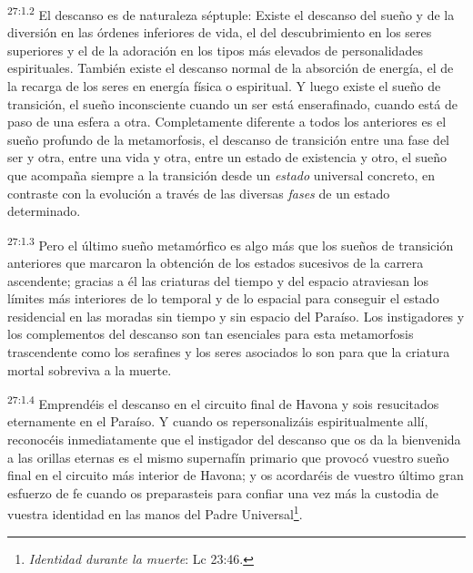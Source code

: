 \par
\textsuperscript{27:1.2} El descanso es de naturaleza séptuple: Existe el descanso del sueño y de la diversión en las órdenes inferiores de vida, el del descubrimiento en los seres superiores y el de la adoración en los tipos más elevados de personalidades espirituales. También existe el descanso normal de la absorción de energía, el de la recarga de los seres en energía física o espiritual. Y luego existe el sueño de transición, el sueño inconsciente cuando un ser está enserafinado, cuando está de paso de una esfera a otra. Completamente diferente a todos los anteriores es el sueño profundo de la metamorfosis, el descanso de transición entre una fase del ser y otra, entre una vida y otra, entre un estado de existencia y otro, el sueño que acompaña siempre a la transición desde un \textit{estado} universal concreto, en contraste con la evolución a través de las diversas \textit{fases} de un estado determinado.

\par
\textsuperscript{27:1.3} Pero el último sueño metamórfico es algo más que los sueños de transición anteriores que marcaron la obtención de los estados sucesivos de la carrera ascendente; gracias a él las criaturas del tiempo y del espacio atraviesan los límites más interiores de lo temporal y de lo espacial para conseguir el estado residencial en las moradas sin tiempo y sin espacio del Paraíso. Los instigadores y los complementos del descanso son tan esenciales para esta metamorfosis trascendente como los serafines y los seres asociados lo son para que la criatura mortal sobreviva a la muerte.

\par
\textsuperscript{27:1.4} Emprendéis el descanso en el circuito final de Havona y sois resucitados eternamente en el Paraíso. Y cuando os repersonalizáis espiritualmente allí, reconocéis inmediatamente que el instigador del descanso que os da la bienvenida a las orillas eternas es el mismo supernafín primario que provocó vuestro sueño final en el circuito más interior de Havona; y os acordaréis de vuestro último gran esfuerzo de fe cuando os preparasteis para confiar una vez más la custodia de vuestra identidad en las manos del Padre Universal\footnote{\textit{Identidad durante la muerte}: Lc 23:46.}.

